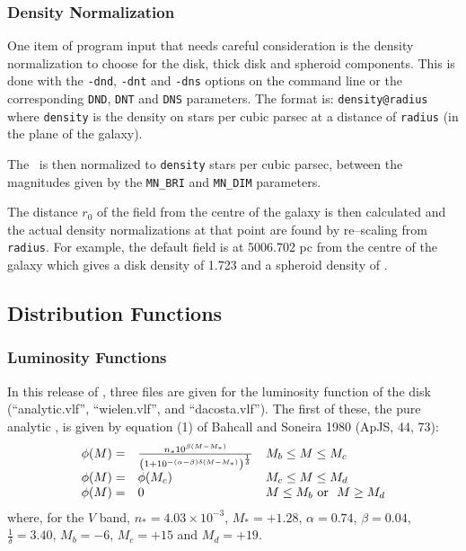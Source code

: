 \subsubsection*{Density Normalization}

One item of program input that needs careful consideration is the density
normalization to choose for the disk, thick disk and spheroid components.
This is done with the {\tt -dnd}, {\tt -dnt} and {\tt -dns} options on the 
command line or the corresponding {\tt DND}, {\tt DNT} and {\tt DNS}
parameters. The format is: {\tt density@radius} where {\tt density} is the 
density on stars per cubic parsec at a distance of {\tt radius} (in the 
plane of the galaxy). 

The \lf\ is then normalized to {\tt density} stars per cubic parsec, between
the magnitudes given by the {\tt MN\_BRI} and {\tt MN\_DIM} parameters.

The distance $r_0$ of the field from the centre of the
galaxy is then calculated and the actual density normalizations at that point
are found by re--scaling from {\tt radius}. For example, the default field is 
at 5006.702 pc from the centre of the galaxy which gives a disk density of 1.723 and a spheroid density of . 

\subsection{Distribution Functions}

\subsubsection*{Luminosity Functions}

In this release of \egm, three files are given for the luminosity function
of the disk (``analytic.vlf'', ``wielen.vlf'', and ``dacosta.vlf''). 
The first of these, the pure analytic \lf, is given by equation (1) of 
Bahcall and Soneira 1980 (ApJS, 44, 73):
\[
\begin{array}{lll}
\phi(M) = & \frac{n_\ast 10^{\beta(M-M_\ast)}}
{\left( 1 + 10^{-(\alpha - \beta)\delta(M-M_\ast)}\right)^{\frac{1}{\delta}}}
& M_b \leq M \leq M_c \nonumber \\
\phi(M) = & \phi(M_c) & M_c \leq M \leq M_d  \\
\phi(M) = & 0 & M \leq M_b {\rm ~or~~} M \geq M_d
\end{array}
\]
where, for the $V$ band, $n_\ast = 4.03 \times 10^{-3}$, $M_\ast = +1.28$, 
$\alpha = 0.74$, $\beta = 0.04$, $\frac{1}{\delta} = 3.40$, $M_b = -6$, 
$M_c = +15$ and $M_d = +19$.
 
